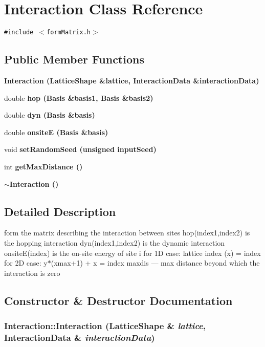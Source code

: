 \section{Interaction Class Reference}
\label{classInteraction}
{\tt \#include $<$form\-Matrix.h$>$}

\subsection*{Public Member Functions}
\begin{CompactItemize}
\item 
\bf{Interaction} (\bf{Lattice\-Shape} \&lattice, \bf{Interaction\-Data} \&interaction\-Data)
\item 
double \bf{hop} (\bf{Basis} \&basis1, \bf{Basis} \&basis2)
\item 
double \bf{dyn} (\bf{Basis} \&basis)
\item 
double \bf{onsite\-E} (\bf{Basis} \&basis)
\item 
void \bf{set\-Random\-Seed} (unsigned input\-Seed)
\item 
int \bf{get\-Max\-Distance} ()
\item 
\bf{$\sim$Interaction} ()
\end{CompactItemize}


\subsection{Detailed Description}
form the matrix describing the interaction between sites hop(index1,index2) is the hopping interaction dyn(index1,index2) is the dynamic interaction onsite\-E(index) is the on-site energy of site i for 1D case: lattice index (x) = index for 2D case: y$\ast$(xmax+1) + x = index maxdis --- max distance beyond which the interaction is zero 



\subsection{Constructor \& Destructor Documentation}
\subsubsection{\setlength{\rightskip}{0pt plus 5cm}Interaction::Interaction (\bf{Lattice\-Shape} \& {\em lattice}, \bf{Interaction\-Data} \& {\em interaction\-Data})\hspace{0.3cm}{\tt  [inline]}}\label{classInteraction_d2b114281bde2e5d1a9f02d73ca10c47}


